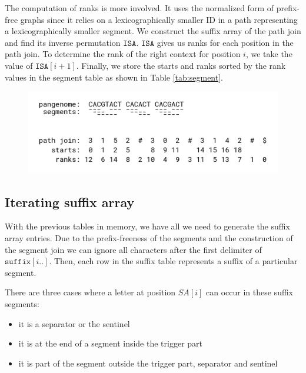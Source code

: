 The computation of ranks is more involved.
It uses the normalized form of prefix-free graphs since it relies on a lexicographically smaller ID in a path representing a lexicographically smaller segment.
We construct the suffix array of the path join and find its inverse permutation $\texttt{ISA}$.
$\texttt{ISA}$ gives us ranks for each position in the path join.
To determine the rank of the right context for position $i$, we take
the value of $\texttt{ISA}[i+1]$.
Finally, we store the starts and ranks sorted by the rank values in the segment table as shown in Table \ref{tab:segment}.

\begin{figure}
    \centering
    \includegraphics[width=\linewidth]{images/path_join.png}
    \caption{}
    \label{fig:path_join}
\end{figure}



\subsection{Iterating suffix array}
With the previous tables in memory, we have all we need to generate the suffix
array entries.
Due to the prefix-freeness of the segments and the construction of the segment join
we can ignore all characters after the first delimiter of $\texttt{suffix}[i..]$.
Then, each row in the suffix table represents a suffix of a particular segment.


There are three cases where a letter at position $SA[i]$ can occur in these suffix segments:
\begin{itemize}
    \item it is a separator or the sentinel
    \item it is at the end of a segment inside the trigger part
    \item it is part of the segment outside the trigger part, separator and sentinel
\end{itemize}

